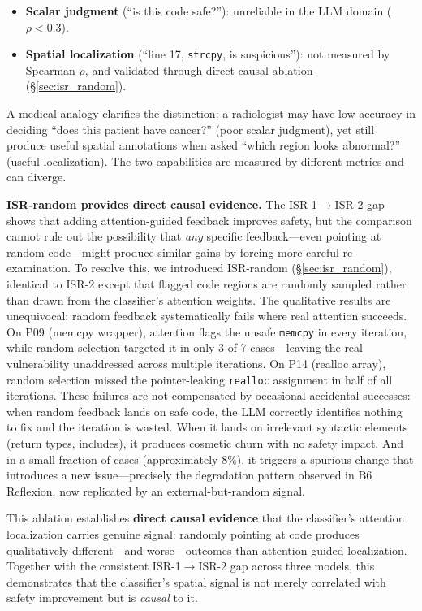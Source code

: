 \documentclass[10pt,conference]{IEEEtran}
\begin{document}
\begin{itemize}
\item \textbf{Scalar judgment} (``is this code safe?''): unreliable in the LLM domain ($\rho<0.3$).
\item \textbf{Spatial localization} (``line 17, \texttt{strcpy}, is suspicious''): not measured by Spearman $\rho$, and validated through direct causal ablation (\S\ref{sec:isr_random}).
\end{itemize}

A medical analogy clarifies the distinction: a radiologist may have low accuracy in deciding ``does this patient have cancer?'' (poor scalar judgment), yet still produce useful spatial annotations when asked ``which region looks abnormal?'' (useful localization). The two capabilities are measured by different metrics and can diverge.

\textbf{ISR-random provides direct causal evidence.}
The ISR-1$\rightarrow$ISR-2 gap shows that adding attention-guided feedback improves safety, but the comparison cannot rule out the possibility that \textit{any} specific feedback---even pointing at random code---might produce similar gains by forcing more careful re-examination. To resolve this, we introduced ISR-random (\S\ref{sec:isr_random}), identical to ISR-2 except that flagged code regions are randomly sampled rather than drawn from the classifier's attention weights. The qualitative results are unequivocal: random feedback systematically fails where real attention succeeds. On P09 (memcpy wrapper), attention flags the unsafe \texttt{memcpy} in every iteration, while random selection targeted it in only 3 of 7 cases---leaving the real vulnerability unaddressed across multiple iterations. On P14 (realloc array), random selection missed the pointer-leaking \texttt{realloc} assignment in half of all iterations. These failures are not compensated by occasional accidental successes: when random feedback lands on safe code, the LLM correctly identifies nothing to fix and the iteration is wasted. When it lands on irrelevant syntactic elements (return types, includes), it produces cosmetic churn with no safety impact. And in a small fraction of cases (approximately 8\%), it triggers a spurious change that introduces a new issue---precisely the degradation pattern observed in B6 Reflexion, now replicated by an external-but-random signal.

This ablation establishes \textbf{direct causal evidence} that the classifier's attention localization carries genuine signal: randomly pointing at code produces qualitatively different---and worse---outcomes than attention-guided localization. Together with the consistent ISR-1$\rightarrow$ISR-2 gap across three models, this demonstrates that the classifier's spatial signal is not merely correlated with safety improvement but is \textit{causal} to it.
\end{document}
